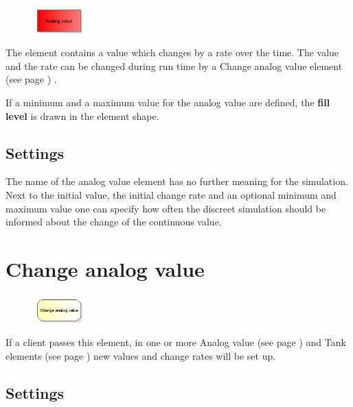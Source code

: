 \begin{figure}
\vspace{-22pt}
\includegraphics[width=2cm]{imageModelElementAnalogValue.png}
\vspace{-22pt}
\end{figure}

The element contains a value which changes by a rate over the time.
The value and the rate can be changed during run time by a
Change analog value element (see page \pageref{ref:ModelElementAnalogAssign}) .

If a minimum and a maximum value for the analog value are defined,
the \textbf{fill level} is drawn in the element shape.

\subsection*{Settings}

The name of the analog value element has no further meaning for the simulation.
Next to the initial value, the initial change rate and an optional minimum and maximum value
one can specify how often the discreet simulation should be informed about the change of
the continuous value.


\section{Change analog value}
\label{ref:ModelElementAnalogAssign}

\begin{figure}
\vspace{-22pt}
\includegraphics[width=2cm]{imageModelElementAnalogAssign.png}
\vspace{-22pt}
\end{figure}

If a client passes this element, in one or more
Analog value (see page \pageref{ref:ModelElementAnalogValue}) and
Tank elements (see page \pageref{ref:ModelElementTank}) 
new values and change rates will be set up.

\subsection*{Settings}

